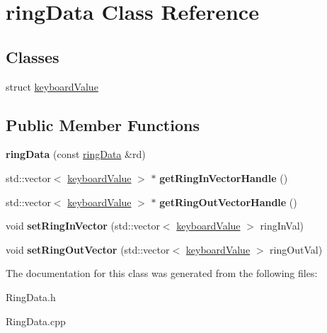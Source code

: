 \hypertarget{classring_data}{\section{ring\+Data Class Reference}
\label{classring_data}
}
\subsection*{Classes}
\begin{DoxyCompactItemize}
\item 
struct \hyperlink{structring_data_1_1keyboard_value}{keyboard\+Value}
\end{DoxyCompactItemize}
\subsection*{Public Member Functions}
\begin{DoxyCompactItemize}
\item 
\hypertarget{classring_data_a8dea49491667b4201d598d58c17b64c4}{{\bfseries ring\+Data} (const \hyperlink{classring_data}{ring\+Data} \&rd)}\label{classring_data_a8dea49491667b4201d598d58c17b64c4}

\item 
\hypertarget{classring_data_af7fd6fa0c88824db516159f43d840f05}{std\+::vector$<$ \hyperlink{structring_data_1_1keyboard_value}{keyboard\+Value} $>$ $\ast$ {\bfseries get\+Ring\+In\+Vector\+Handle} ()}\label{classring_data_af7fd6fa0c88824db516159f43d840f05}

\item 
\hypertarget{classring_data_ae0a8b742358271e92a4bfcad11bbb197}{std\+::vector$<$ \hyperlink{structring_data_1_1keyboard_value}{keyboard\+Value} $>$ $\ast$ {\bfseries get\+Ring\+Out\+Vector\+Handle} ()}\label{classring_data_ae0a8b742358271e92a4bfcad11bbb197}

\item 
\hypertarget{classring_data_a189c1244a8472ebaf7e9e24a9d2465d4}{void {\bfseries set\+Ring\+In\+Vector} (std\+::vector$<$ \hyperlink{structring_data_1_1keyboard_value}{keyboard\+Value} $>$ ring\+In\+Val)}\label{classring_data_a189c1244a8472ebaf7e9e24a9d2465d4}

\item 
\hypertarget{classring_data_ae46cf7c208005f9be4e21c84a00b8d8a}{void {\bfseries set\+Ring\+Out\+Vector} (std\+::vector$<$ \hyperlink{structring_data_1_1keyboard_value}{keyboard\+Value} $>$ ring\+Out\+Val)}\label{classring_data_ae46cf7c208005f9be4e21c84a00b8d8a}

\end{DoxyCompactItemize}


The documentation for this class was generated from the following files\+:\begin{DoxyCompactItemize}
\item 
Ring\+Data.\+h\item 
Ring\+Data.\+cpp\end{DoxyCompactItemize}
